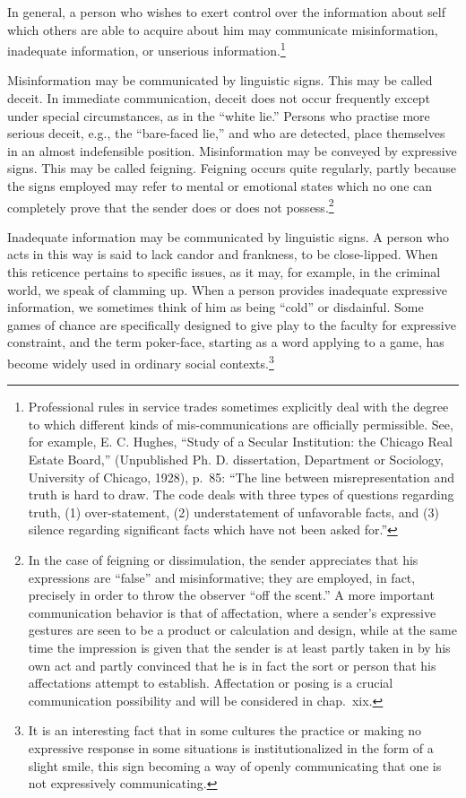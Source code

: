 \documentclass[openany,nobib]{tufte-book}
\begin{document}
In general, a person who wishes to exert control over the information
about self which others are able to acquire about him may communicate
misinformation, inadequate information, or unserious
information.\footnote{Professional rules in service trades sometimes
  explic­itly deal with the degree to which different kinds of
  mis-communications are officially permissible. See, for example, E. C.
  Hughes, ``Study of a Secular Institution: the Chicago Real Estate
  Board,'' (Unpublished Ph. D. dissertation, Department or Sociolo­gy,
  University of Chicago, 1928), p.~85: ``The line between
  misrepresentation and truth is hard to draw. The code deals with three
  types of questions regarding truth, (1) over-statement, (2)
  understatement of unfavorable facts, and (3) silence regarding
  significant facts which have not been asked for.''}

Misinformation may be communicated by linguistic signs. This may be
called deceit. In immediate communication, deceit does not occur
frequently except under special circumstances, as in the ``white lie.''
Persons who practise more serious deceit, e.g., the ``bare-faced lie,''
and who are detected, place them­selves in an almost indefensible
position. Misinformation may be conveyed by expressive signs. This may
be called feigning. Feigning occurs quite regularly, partly because the
signs em­ployed may refer to mental or emotional states which no one can
completely prove that the sender does or does not possess.\footnote{In
  the case of feigning or dissimulation, the sender appreciates that his
  expressions are ``false'' and misinformative; they are employed, in
  fact, precisely in order to throw the observer ``off the scent.'' A
  more important communication be­havior is that of affectation, where a
  sender's expressive ges­tures are seen to be a product or calculation
  and design, while at the same time the impression is given that the
  sender is at least partly taken in by his own act and partly convinced
  that he is in fact the sort or person that his affectations attempt to
  establish. Affectation or posing is a crucial communication
  possibility and will be considered in chap.~xix.}

Inadequate information may be communicated by linguistic signs. A person
who acts in this way is said to lack candor and frankness, to be
close-lipped. When this reticence pertains to specific issues, as it
may, for example, in the criminal world, we speak of clamming up. When a
person provides inadequate ex­pressive information, we sometimes think of
him as being ``cold'' or disdainful. Some games of chance are
specifically designed to give play to the faculty for expressive
constraint, and the term poker-face, starting as a word applying to a
game, has become widely used in ordinary social contexts.\footnote{It is
  an interesting fact that in some cultures the practice or making no
  expressive response in some situations is institutionalized in the
  form of a slight smile, this sign be­coming a way of openly
  communicating that one is not expressively communicating.}
\end{document}
